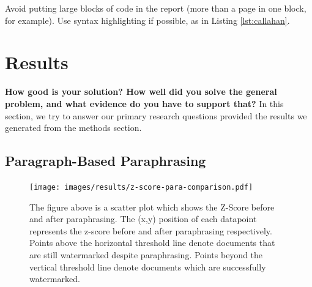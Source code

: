 \documentclass{l4proj}
\theoremstyle{definition}
\begin{document}

Avoid putting large blocks of code in the report (more than a page in one block, for example). Use syntax highlighting if possible, as in Listing \ref{lst:callahan}.

\chapter{Results} 
\textbf{How good is your solution? How well did you solve the general problem, and what evidence do you have to support that?}
In this section, we try to answer our primary research questions provided the results we generated from the methods section. 


\section{Paragraph-Based Paraphrasing}


    
    \begin{figure}[h]
        \centering
        \texttt{[image: images/results/z-score-para-comparison.pdf]}
            \caption{The figure above is a scatter plot which shows the Z-Score before and after paraphrasing. The (x,y) position of each datapoint represents the z-score before and after paraphrasing respectively. Points above the horizontal threshold line denote documents that are still watermarked despite paraphrasing. Points beyond the vertical threshold line denote documents which are successfully watermarked.}
        \label{fig:paragraph-z-score} 
    \end{figure}
\end{document}

